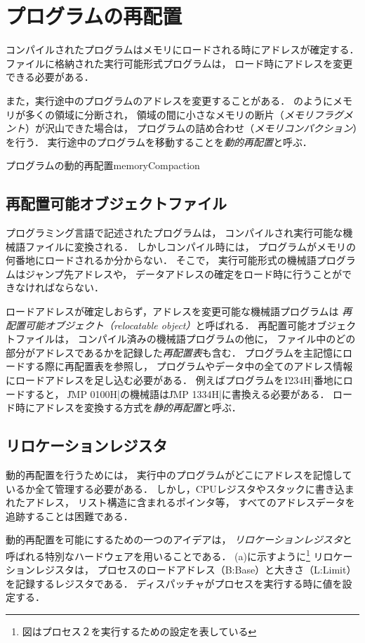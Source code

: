 \section{プログラムの再配置}
コンパイルされたプログラムはメモリにロードされる時にアドレスが確定する．
ファイルに格納された実行可能形式プログラムは，
ロード時にアドレスを変更できる必要がある．

また，実行途中のプログラムのアドレスを変更することがある．
のようにメモリが多くの領域に分断され，
領域の間に小さなメモリの断片（\emph{メモリフラグメント}）が沢山できた場合は，
プログラムの詰め合わせ（\emph{メモリコンパクション}）を行う．
実行途中のプログラムを移動することを\emph{動的再配置}と呼ぶ．

{プログラムの動的再配置}{memoryCompaction}

\subsection{再配置可能オブジェクトファイル}
プログラミング言語で記述されたプログラムは，
コンパイルされ実行可能な機械語ファイルに変換される．
しかしコンパイル時には，
プログラムがメモリの何番地にロードされるか分からない．
そこで，
実行可能形式の機械語プログラムはジャンプ先アドレスや，
データアドレスの確定をロード時に行うことができなければならない．

ロードアドレスが確定しおらず，アドレスを変更可能な機械語プログラムは
\emph{再配置可能オブジェクト（relocatable object）}と呼ばれる．
再配置可能オブジェクトファイルは，
コンパイル済みの機械語プログラムの他に，
ファイル中のどの部分がアドレスであるかを記録した\emph{再配置表}も含む．
プログラムを主記憶にロードする際に再配置表を参照し，
プログラムやデータ中の全てのアドレス情報にロードアドレスを足し込む必要がある．
例えばプログラムを\|1234H|番地にロードすると，
\|JMP 0100H|の機械語は\|JMP 1334H|に書換える必要がある．
ロード時にアドレスを変換する方式を\emph{静的再配置}と呼ぶ．

\subsection{リロケーションレジスタ}
動的再配置を行うためには，
実行中のプログラムがどこにアドレスを記憶しているか全て管理する必要がある．
しかし，CPUレジスタやスタックに書き込まれたアドレス，
リスト構造に含まれるポインタ等，
すべてのアドレスデータを追跡することは困難である．

動的再配置を可能にするための一つのアイデアは，
\emph{リロケーションレジスタ}と呼ばれる特別なハードウェアを用いることである．
(a)に示すように\footnote{
図はプロセス２を実行するための設定を表している}
リロケーションレジスタは，
プロセスのロードアドレス（B:Base）と大きさ（L:Limit）を記録するレジスタである．
ディスパッチャがプロセスを実行する時に値を設定する．

